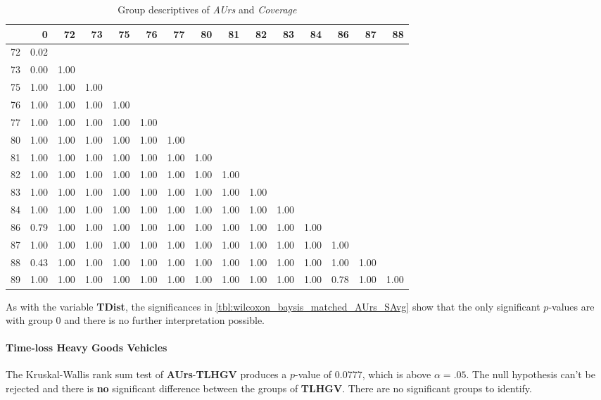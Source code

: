 \begin{table}[ht]
	\tiny
	\centering
    \begin{tabular}{rrrrrrrrrrrrrrr}
        \toprule
        & 0 & 72 & 73 & 75 & 76 & 77 & 80 & 81 & 82 & 83 & 84 & 86 & 87 & 88 \\ 
        \midrule
        72 & 0.02 &  &  &  &  &  &  &  &  &  &  &  &  &  \\ 
        73 & 0.00 & 1.00 &  &  &  &  &  &  &  &  &  &  &  &  \\ 
        75 & 1.00 & 1.00 & 1.00 &  &  &  &  &  &  &  &  &  &  &  \\ 
        76 & 1.00 & 1.00 & 1.00 & 1.00 &  &  &  &  &  &  &  &  &  &  \\ 
        77 & 1.00 & 1.00 & 1.00 & 1.00 & 1.00 &  &  &  &  &  &  &  &  &  \\ 
        80 & 1.00 & 1.00 & 1.00 & 1.00 & 1.00 & 1.00 &  &  &  &  &  &  &  &  \\ 
        81 & 1.00 & 1.00 & 1.00 & 1.00 & 1.00 & 1.00 & 1.00 &  &  &  &  &  &  &  \\ 
        82 & 1.00 & 1.00 & 1.00 & 1.00 & 1.00 & 1.00 & 1.00 & 1.00 &  &  &  &  &  &  \\ 
        83 & 1.00 & 1.00 & 1.00 & 1.00 & 1.00 & 1.00 & 1.00 & 1.00 & 1.00 &  &  &  &  &  \\ 
        84 & 1.00 & 1.00 & 1.00 & 1.00 & 1.00 & 1.00 & 1.00 & 1.00 & 1.00 & 1.00 &  &  &  &  \\ 
        86 & 0.79 & 1.00 & 1.00 & 1.00 & 1.00 & 1.00 & 1.00 & 1.00 & 1.00 & 1.00 & 1.00 &  &  &  \\ 
        87 & 1.00 & 1.00 & 1.00 & 1.00 & 1.00 & 1.00 & 1.00 & 1.00 & 1.00 & 1.00 & 1.00 & 1.00 &  &  \\ 
        88 & 0.43 & 1.00 & 1.00 & 1.00 & 1.00 & 1.00 & 1.00 & 1.00 & 1.00 & 1.00 & 1.00 & 1.00 & 1.00 &  \\ 
        89 & 1.00 & 1.00 & 1.00 & 1.00 & 1.00 & 1.00 & 1.00 & 1.00 & 1.00 & 1.00 & 1.00 & 0.78 & 1.00 & 1.00 \\ 
        \bottomrule
      \end{tabular}
	\caption{Group descriptives of \textit{AUrs} and \textit{Coverage}}
	\label{tbl:wilcoxon_baysis_matched_AUrs_Cov}
\end{table}
As with the variable \textbf{TDist}, the significances in \autoref{tbl:wilcoxon_baysis_matched_AUrs_SAvg} show that the only significant $p$-values are with group 0 and there is no further interpretation possible.

\paragraph{Time-loss Heavy Goods Vehicles}
The Kruskal-Wallis rank sum test of \textbf{AUrs}-\textbf{TLHGV} produces a $p$-value of 0.0777, which is above $\alpha=.05$. The null hypothesis can't be rejected and there is \textbf{no} significant difference between the groups of \textbf{TLHGV}. There are no significant groups to identify.

